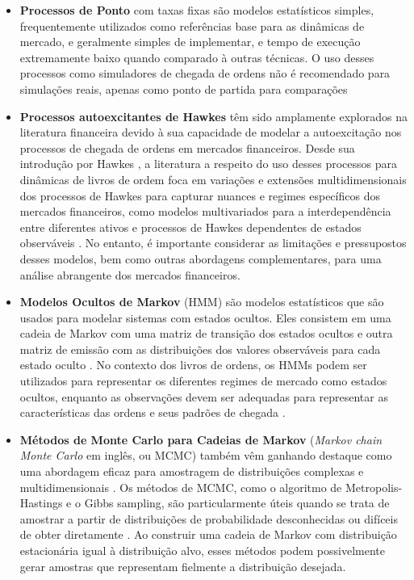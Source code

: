 \begin{itemize}
	\item \textbf{Processos de Ponto} com taxas fixas são modelos estatísticos simples, frequentemente utilizados como referências base para as dinâmicas de mercado, e geralmente simples de implementar, e tempo de execução extremamente baixo quando comparado à outras técnicas. O uso desses processos como simuladores de chegada de ordens não é recomendado para simulações reais, apenas como ponto de partida para comparações \citep{Bouchaud2002, Cont2011}

	\item \textbf{Processos autoexcitantes de Hawkes} têm sido amplamente explorados na literatura financeira devido à sua capacidade de modelar a autoexcitação nos processos de chegada de ordens em mercados financeiros. Desde sua introdução por Hawkes \citep{Hawkes1971}, a literatura a respeito do uso desses processos para dinâmicas de livros de ordem foca em variações e extensões multidimensionais dos processos de Hawkes para capturar nuances e regimes específicos dos mercados financeiros, como modelos multivariados para a interdependência entre diferentes ativos \citep{Bacry2015} e processos de Hawkes dependentes de estados observáveis \citep{MorariuPatrichi2022}. No entanto, é importante considerar as limitações e pressupostos desses modelos, bem como outras abordagens complementares, para uma análise abrangente dos mercados financeiros.
	
	\item \textbf{Modelos Ocultos de Markov} (HMM) são modelos estatísticos que são usados para modelar sistemas com estados ocultos. Eles consistem em uma cadeia de Markov com uma matriz de transição dos estados ocultos e outra matriz de emissão com as distribuições dos valores observáveis para cada estado oculto \citep{Li2005}. No contexto dos livros de ordens, os HMMs podem ser utilizados para representar os diferentes regimes de mercado como estados ocultos, enquanto as observações devem ser adequadas para representar as características das ordens e seus padrões de chegada \citep{Sandoval2015}.
	
	\item \textbf{Métodos de Monte Carlo para Cadeias de Markov} (\textit{Markov chain Monte Carlo } em inglês, ou MCMC) também vêm ganhando destaque como uma abordagem eficaz para amostragem de distribuições complexas e multidimensionais \citep{Rasmussen2013, Rousseau2018}. Os métodos de MCMC, como o algoritmo de Metropolis-Hastings e o Gibbs sampling, são particularmente úteis quando se trata de amostrar a partir de distribuições de probabilidade desconhecidas ou difíceis de obter diretamente \citep{Glasserman2004}. Ao construir uma cadeia de Markov com distribuição estacionária igual à distribuição alvo, esses métodos podem possivelmente gerar amostras que representam fielmente a distribuição desejada.
	

\end{itemize}
